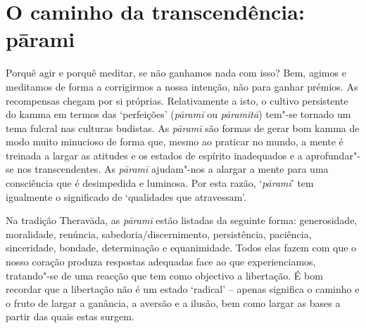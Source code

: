 \section{O caminho da transcendência: pārami}

Porquê agir e porquê meditar, se não ganhamos nada com isso? Bem, agimos e
meditamos de forma a corrigirmos a nossa intenção, não para ganhar prémios. As
recompensas chegam por si próprias. Relativamente a isto, o cultivo persistente
do kamma em termos das `perfeições' (\emph{pāramī} ou \emph{pāramitā}) tem"-se
tornado um tema fulcral nas culturas budistas.
As \emph{pāramī} são formas de gerar bom kamma de modo muito minucioso de forma
que, mesmo ao praticar no mundo, a mente é treinada a largar as atitudes e os
estados de espírito inadequados e a aprofundar"-se nos transcendentes. As
\emph{pāramī} ajudam"-nos a alargar a mente para uma consciência que é
desimpedida e luminosa. Por esta razão, `\emph{pāramī}' tem igualmente o
significado de `qualidades que atravessam'.

Na tradição Theravāda, as \emph{pāramī} estão listadas da seguinte forma:
generosidade, moralidade, renúncia, sabedoria/discernimento, persistência,
paciência, sinceridade, bondade, determinação e equanimidade. Todos elas fazem
com que o nosso coração produza respostas adequadas face ao que experienciamos,
tratando"-se de uma reacção que tem como objectivo a libertação. É bom recordar
que a libertação não é um estado `radical' -- apenas significa o caminho e o
fruto de largar a ganância, a aversão e a ilusão, bem como largar as bases a
partir das quais estas surgem.

